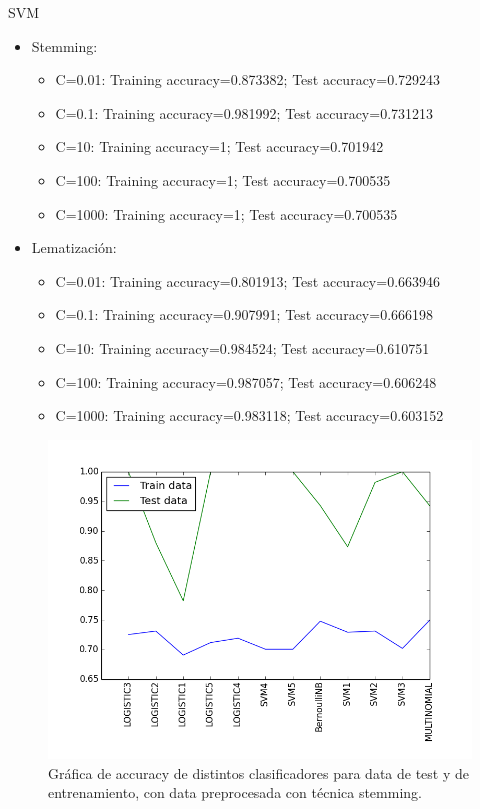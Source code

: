 \documentclass[letter, 10pt]{article}
\begin{document}
SVM
\begin{itemize}
  \item Stemming: 
  \begin{itemize}
    \item C=0.01: Training accuracy=0.873382; Test accuracy=0.729243
    \item C=0.1: Training accuracy=0.981992; Test accuracy=0.731213
    \item C=10: Training accuracy=1; Test accuracy=0.701942
    \item C=100: Training accuracy=1; Test accuracy=0.700535
    \item C=1000: Training accuracy=1; Test accuracy=0.700535
  \end{itemize}
  \item Lematización: 
    \begin{itemize}
    \item C=0.01: Training accuracy=0.801913; Test accuracy=0.663946
    \item C=0.1: Training accuracy=0.907991; Test accuracy=0.666198
    \item C=10: Training accuracy=0.984524; Test accuracy=0.610751
    \item C=100: Training accuracy=0.987057; Test accuracy=0.606248
    \item C=1000: Training accuracy=0.983118; Test accuracy=0.603152
  \end{itemize}
\end{itemize}

\begin{figure}[h]
\begin{center}
\includegraphics[width=1\textwidth]{Images/figure_pregunta_2.png}
\caption{Gráfica de accuracy de distintos clasificadores para data de test y de entrenamiento, con data preprocesada con técnica stemming.}
\label{G1.1}
\end{center}
\end{figure}
\end{document}
